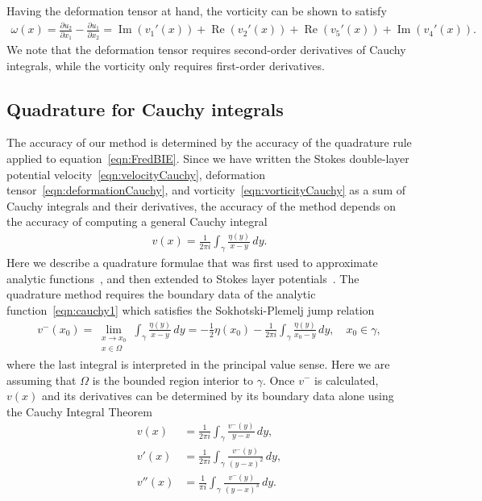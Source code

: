 \documentclass[3p]{elsarticle}
\renewcommand{\Re}{{\operatorname{Re}}}
\renewcommand{\Im}{{\operatorname{Im}}}
\newcommand{\pderiv}[2]{\frac{\partial #1}{\partial #2}}
\begin{document}
Having the deformation tensor at hand, the vorticity can be shown to
satisfy
\begin{align}
  \omega(x) = \pderiv{u_2}{x_1} - \pderiv{u_1}{x_2} = 
     \Im(v_1'(x)) + \Re(v_2'(x)) + \Re(v_5'(x)) + \Im(v_4'(x)).
  \label{eqn:vorticityCauchy}
\end{align}
We note that the deformation tensor requires second-order derivatives of
Cauchy integrals, while the vorticity only requires first-order
derivatives.

\subsection{Quadrature for Cauchy integrals}
The accuracy of our method is determined by the accuracy of the
quadrature rule applied to equation~\eqref{eqn:FredBIE}. Since we have
written the Stokes double-layer potential
velocity~\eqref{eqn:velocityCauchy}, deformation
tensor~\eqref{eqn:deformationCauchy}, and
vorticity~\eqref{eqn:vorticityCauchy} as a sum of Cauchy integrals and
their derivatives, the accuracy of the method depends on the accuracy of
computing a general Cauchy integral
\begin{align}
  v(x) = \frac{1}{2\pi i} \int_{\gamma} \frac{\eta(y)}{x-y} \, dy.
  \label{eqn:cauchy1}
\end{align}
Here we describe a quadrature formulae that was first used to
approximate analytic functions~\cite{ioa-pap-per1991}, and then extended
to Stokes layer potentials~\cite{bar-wu-vee2015}. The quadrature method
requires the boundary data of the analytic function~\eqref{eqn:cauchy1}
which satisfies the Sokhotski-Plemelj jump relation
\begin{align}
  v^{-}(x_0) = \lim_{\substack{x \rightarrow x_0 \\ x \in \Omega}} \int_{\gamma}
    \frac{\eta(y)}{x-y}\, dy = -\frac{1}{2}\eta(x_0) - 
    \frac{1}{2\pi i} \int_{\gamma} \frac{\eta(y)}{x_0-y} \, dy,
    \quad x_0 \in \gamma,
    \label{eqn:SP}
\end{align}
where the last integral is interpreted in the principal value sense.
Here we are assuming that $\Omega$ is the bounded region interior to
$\gamma$. Once $v^{-}$ is calculated, $v(x)$ and its derivatives can be
determined by its boundary data alone using the Cauchy Integral Theorem
\begin{subequations}
  \label{eqn:cauchy}
  \begin{alignat}{3}
  \label{eqn:cauchyv}
  v(x) &= \frac{1}{2\pi i}\int_{\gamma} 
    \frac{v^{-}(y)}{y-x} \,dy, \\
  v'(x) &= \frac{1}{2\pi i} \int_{\gamma}
    \frac{v^{-}(y)}{(y-x)^2} \, dy, \\
  v''(x) &= \frac{1}{\pi i} \int_{\gamma}
    \frac{v^{-}(y)}{(y-x)^3} \, dy.
  \end{alignat}
\end{subequations}
\end{document}
